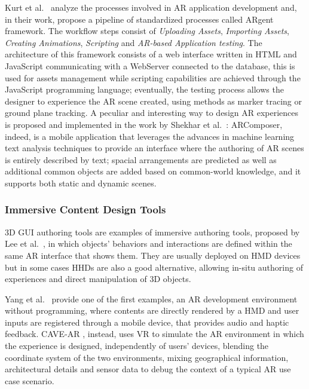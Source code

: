 Kurt et al.~\cite{kurt_argent_2020} analyze the processes involved in AR application development and, in their work, propose a pipeline of standardized processes called ARgent framework. The workflow steps consist of \textit{Uploading Assets}, \textit{Importing Assets}, \textit{Creating Animations}, \textit{Scripting} and \textit{AR-based Application testing}. The architecture of  this framework consists of a web interface written in HTML and JavaScript communicating with a WebServer connected to the database, this is used for assets management while scripting capabilities are achieved through the JavaScript programming language; eventually, the testing process allows the designer to experience the AR scene created, using methods as marker tracing or ground plane tracking.
A peculiar and interesting way to design AR experiences is proposed and implemented in the work by Shekhar et al.~\cite{shekhar_arcomposer_2019}: ARComposer, indeed, is a mobile application that leverages the advances in machine learning text analysis techniques to provide an interface where the authoring of AR scenes is entirely described by text; spacial arrangements are predicted as well as additional common objects are added based on common-world knowledge, and it supports both static and dynamic scenes.

\subsubsection{Immersive Content Design Tools}
\label{subsec:related-immersice-hcdf}
3D GUI authoring tools are examples of immersive authoring tools, proposed by Lee et al.~\cite{lee2005immersive}, in which objects' behaviors and interactions are defined within the same AR interface that shows them. They are usually deployed on HMD devices but in some cases HHDs are also a good alternative, allowing in-situ authoring of experiences and direct manipulation of 3D objects.

Yang et al.~\cite{yang_interactive_2016} provide one of the first examples, an AR development environment without programming, where contents are directly rendered by a HMD and user inputs are registered through a mobile device, that provides audio and haptic feedback. CAVE-AR \cite{cavallo_cave-ar_2019}, instead, uses VR to simulate the AR environment in which the experience is designed, independently of users' devices, blending the coordinate system of the two environments, mixing geographical information, architectural details and sensor data to debug the context of a typical AR use case scenario.

